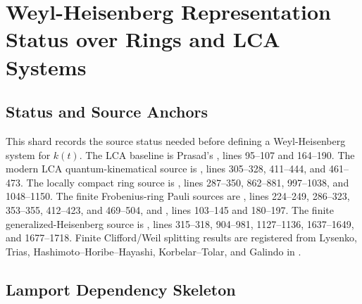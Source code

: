
\section{Weyl-Heisenberg Representation Status over Rings and LCA Systems}
\label{sec:weyl-heisenberg-research-status-rings}

\subsection{Status and Source Anchors}

This shard records the source status needed before defining a Weyl-Heisenberg
system for \(k(t)\).  The LCA baseline is Prasad's
, lines
95--107 and 164--190.  The modern LCA quantum-kinematical source is
,
lines 305--328, 411--444, and 461--473.  The locally compact ring source is
,
lines 287--350, 862--881, 997--1038, and 1048--1150.  The finite
Frobenius-ring Pauli sources are
,
lines 224--249, 286--323, 353--355, 412--423, and 469--504, and
,
lines 103--145 and 180--197.  The finite generalized-Heisenberg source is
,
lines 315--318, 904--981, 1127--1136, 1637--1649, and 1677--1718.
Finite Clifford/Weil splitting results are registered from Lysenko, Trias,
Hashimoto--Horibe--Hayashi, Korbelar--Tolar, and Galindo in
.

\subsection{Lamport Dependency Skeleton}

